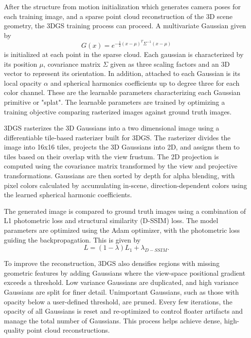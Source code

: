 After the structure from motion initialization which generates camera poses for each training image, and a sparse point cloud reconstruction of the 3D scene geometry, the 3DGS training process can proceed. A multivariate Gaussian given by
\begin{equation} \label{eq:lossGaussian}
    G(x) = e^{-\frac{1}{2} (x-\mu)^T \Sigma^{-1} (x-\mu)}
\end{equation}
is initialized at each point in the sparse cloud. Each gaussian is characterized by its position $\mu$, covariance matrix $\Sigma$ given as three scaling factors and an 3D vector to represent its orientation. In addition, attached to each Gaussian is its local opacity $\alpha$ and spherical harmonics coefficients up to degree three for each color channel. These are the learnable parameters characterizing each Gaussian primitive or "splat". The learnable parameters are trained by optimizing a training objective comparing rasterized images against ground truth images. 

3DGS rasterizes the 3D Gaussians into a two dimensional image using a differentiable tile-based rasterizer built for 3DGS. The rasterizer divides the image into 16x16 tiles, projects the 3D Gaussians into 2D, and assigns them to tiles based on their overlap with the view frustum. The 2D projection is computed using the covariance matrix transformed by the view and projective transformations. Gaussians are then sorted by depth for alpha blending, with pixel colors calculated by accumulating in-scene, direction-dependent colors using the learned spherical harmonic coefficients.

The generated image is compared to ground truth images using a combination of L1 photometric loss and structural similarity (D-SSIM) \cite{2004ssim} loss. The model parameters are optimized using the Adam optimizer, with the photometric loss guiding the backpropagation. This is given by
\begin{equation}
    L = (1 - \lambda)L_1 + \lambda_{D-SSIM}.
\end{equation}

To improve the reconstruction, 3DGS also densifies regions with missing geometric features by adding Gaussians where the view-space positional gradient exceeds a threshold. Low variance Gaussians are duplicated, and high variance Gaussians are split for finer detail. Unimportant Gaussians, such as those with opacity below a user-defined threshold, are pruned. Every few iterations, the opacity of all Gaussians is reset and re-optimized to control floater artifacts and manage the total number of Gaussians. This process helps achieve dense, high-quality point cloud reconstructions.

